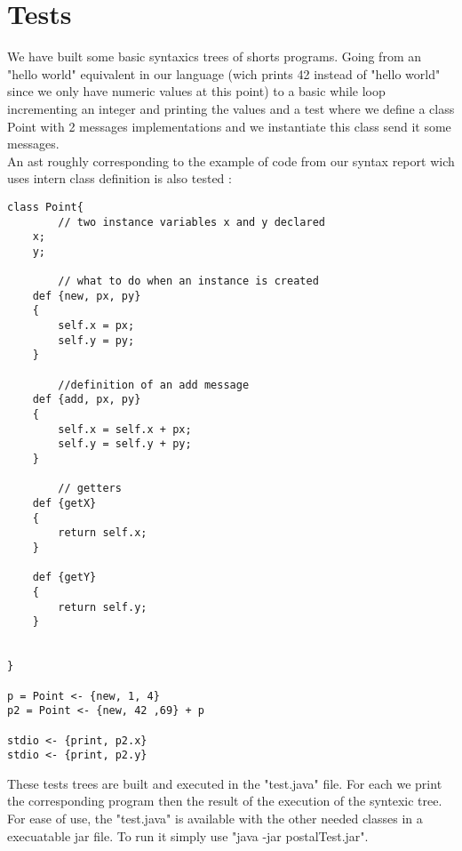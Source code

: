 \documentclass{eplDoc}
\begin{document}
\section{Tests}

We have built some basic syntaxics trees of shorts programs. Going from an "hello world" equivalent in our language (wich prints 42 instead of "hello world" since we only have numeric values at this point) to a basic while loop incrementing an integer and printing the values and a test where we define a class Point with 2 messages implementations and we instantiate this class send it some messages.\\ 
An ast roughly corresponding to the example of code from our syntax report wich uses intern class definition is also tested :  

\begin{lstlisting}
class Point{
		// two instance variables x and y declared
    x;
    y;

		// what to do when an instance is created
    def {new, px, py}
    {
        self.x = px;
        self.y = py;
    }
		
		//definition of an add message
    def {add, px, py}
    {
        self.x = self.x + px;
        self.y = self.y + py;
    }

		// getters
    def {getX}
    {
        return self.x;    
    }
    
    def {getY}
    {
        return self.y;    
    }
		
		
}

p = Point <- {new, 1, 4}
p2 = Point <- {new, 42 ,69} + p

stdio <- {print, p2.x}
stdio <- {print, p2.y}

\end{lstlisting}
These tests trees are built and executed in the "test.java" file. For each we print the corresponding program then the result of the execution of the syntexic tree. \\ 
For ease of use, the "test.java" is available with the other needed classes in a execuatable jar file. To run it simply use "java -jar postalTest.jar".
\end{document}
